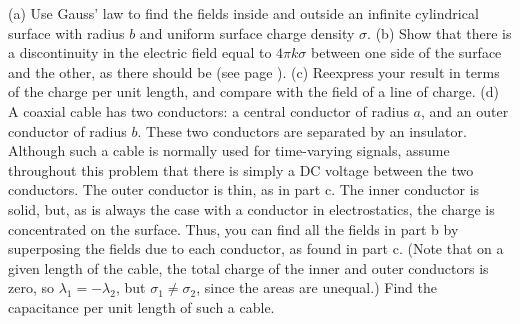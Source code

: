 (a) Use Gauss' law to find the fields inside and outside an
        infinite cylindrical surface with radius $b$ and uniform
        surface charge density $\sigma$.\answercheck\hwendpart
        (b) Show that there is a discontinuity in the electric field equal to $4\pi k \sigma$
        between one side of the surface and the other, as there should be (see page \pageref{e-discontinuity}).\hwendpart
         (c) Reexpress your result in terms of the charge per unit
         length, and compare with the field of a line of charge.\hwendpart
        (d) A coaxial cable has two conductors:
        a central conductor of radius $a$, and an outer conductor of
        radius $b$. These two conductors are separated by an insulator.
        Although such a cable is normally used for time-varying signals,
        assume throughout this problem that there is simply a DC voltage
        between the two conductors.
        The outer conductor is thin, as in part c. The inner
        conductor is solid, but, as is always the case with a conductor in electrostatics,
        the charge is concentrated on the surface. Thus, you can 
        find all the fields in part b by superposing the fields due
        to each conductor, as found in part c. (Note that on a given length of the cable,
        the total charge of the inner and outer conductors is zero, so $\lambda_1=-\lambda_2$,
        but $\sigma_1\ne\sigma_2$, since the areas are unequal.)
        Find the capacitance per unit length of such a cable.\answercheck
